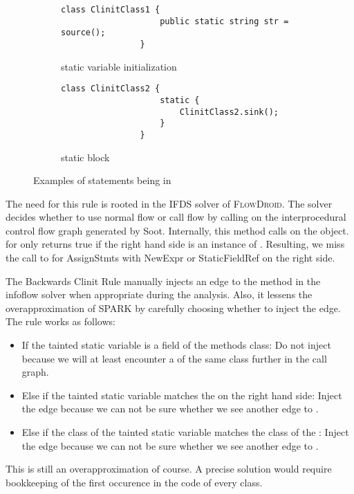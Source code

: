 \documentclass[../draft.tex]{subfiles}
\begin{document}
    \begin{figure}[ht]
        \centering
        \begin{subfigure}[b]{0.45\textwidth}
            \centering
            \begin{lstlisting}[gobble=16]
                class ClinitClass1 {
                    public static string str = source();
                }
            \end{lstlisting}
            \caption{static variable initialization}
            \label{lst:clinit_examples_a}
        \end{subfigure}
        \hfill
        \begin{subfigure}[b]{0.45\textwidth}
            \centering
            \begin{lstlisting}[gobble=16]
                class ClinitClass2 {
                    static {
                        ClinitClass2.sink();
                    }
                }
            \end{lstlisting}
            \caption{static block}
            \label{lst:clinit_examples_b}
        \end{subfigure}
        \caption{Examples of statements being in }
        \label{lst:clinit_examples}
    \end{figure}


    The need for this rule is rooted in the IFDS solver of \textsc{FlowDroid}. The solver decides whether to use normal flow or call flow by calling  on the interprocedural control flow graph generated by Soot. Internally, this method calls  on the  object.  for  only returns true if the right hand side is an instance of . Resulting, we miss the call to  for AssignStmts with NewExpr or StaticFieldRef on the right side.

    The Backwards Clinit Rule manually injects an edge to the  method in the infoflow solver when appropriate during the analysis. Also, it lessens the overapproximation of SPARK by carefully choosing whether to inject the edge. The rule works as follows:
    \begin{itemize}
        \item If the tainted static variable is a field of the methods class: Do not inject because we will at least encounter a  of the same class further in the call graph.
        \item Else if the tainted static variable matches the  on the right hand side: Inject the edge because we can not be sure whether we see another edge to .
        \item Else if the class of the tainted static variable matches the class of the : Inject the edge because we can not be sure whether we see another edge to .
    \end{itemize}
    This is still an overapproximation of course. A precise solution would require bookkeeping of the first occurence in the code of every class. 
\end{document}
